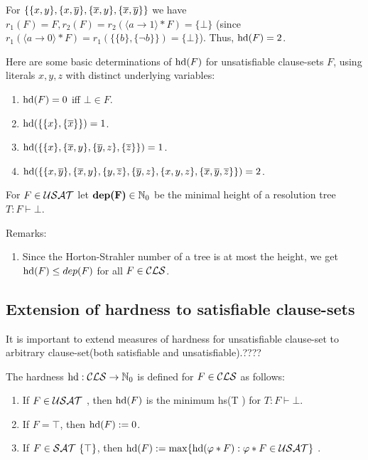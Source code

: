 \documentclass[12pt]{book}
\begin{document}
\begin{examp}\label{exp:hardness1}
      For $\{ \{ x,y \},\{ x,\overline{y} \},\{ \overline{x},y \},\{ \overline{x},\overline{y} \} \}$ we have $r_1(F)=F, r_2(F)=r_2( \langle a \rightarrow 1 \rangle * F) = \{ \bot \}$
	  (since $r_1( \langle a \rightarrow 0 \rangle * F)=r_1 (\{\{ b \}, \{ \neg b \}\}) = \{ \bot \}$). Thus, $\operatorname{hd}(F) = 2$.
\end{examp}

\begin{examp}\label{exp:harducls}
  Here are some basic determinations of $\operatorname{hd}(F)$ for unsatisfiable clause-sets $F$, using literals $x,y,z$ with distinct underlying variables:
  \begin{enumerate}
  \item $\operatorname{hd}(F) = 0$ iff $\bot \in F$.
  \item $\operatorname{hd}(\{ \{ x \},\{ \overline{x} \} \}) = 1$.
  \item $\operatorname{hd}(\{ \{ x \},\{ \overline{x},y \}, \{ \overline{y},z \}, \{ \overline{z} \} \}) = 1$.
  \item $\operatorname{hd}(\{ \{ x,\overline{y} \},\{ \overline{x},y \},\{ y,\overline{z} \},\{ \overline{y},z \},\{ x,y,z \},\{ \overline{x},\overline{y},\overline{z} \} \}) = 2$.
  \end{enumerate}
\end{examp}

\begin{defi}\label{def:hardness2}
      For $F \in \mathcal{USAT}$ let $\textbf{dep(F)} \in \mathbb{N}_0$ be the minimal height of a resolution tree $T : F \vdash \bot$.
\end{defi}

Remarks:
\begin{enumerate}
  \item Since the Horton-Strahler number of a tree is at most the height, we get $\operatorname{hd}(F) \leq dep(F)$ for all $F \in \mathcal{CLS}$.
\end{enumerate}
\subsection{Extension of hardness to satisfiable clause-sets}
\label{sec:extension_Hardness}

It is important to extend measures of hardness for unsatisfiable clause-set to arbitrary clause-set(both satisfiable and unsatisfiable).????
\begin{defi}\label{def:ex-hardness}
The hardness $\operatorname{hd} : \mathcal{CLS} \rightarrow \mathbb{N}_0$ is defined for $F \in \mathcal{CLS}$ as follows:
\begin{enumerate}
  \item If $F \in \mathcal{USAT}$ , then $\operatorname{hd}(F)$ is the minimum hs(T ) for $T : F \vdash \bot$.
  \item If $F = \top$, then $\operatorname{hd}(F) := 0$.
  \item If $F \in \mathcal{SAT} \ \{ \top \}$, then $\operatorname{hd}(F) := \max \{ \operatorname{hd}(\varphi * F) : \varphi * F \in \mathcal{USAT} \}$ \cite{h11}.
  \end{enumerate}
\end{defi}
\end{document}
